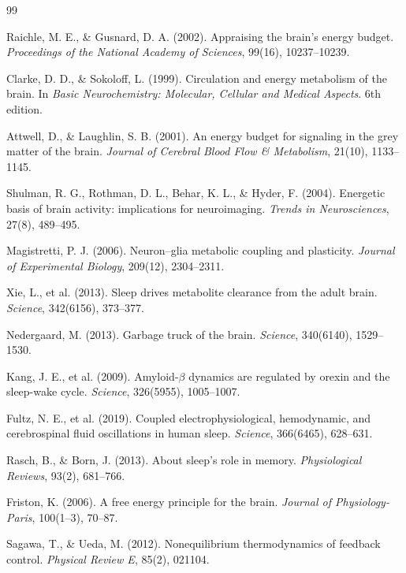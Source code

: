 \documentclass[12pt]{article}
\theoremstyle{remark}
\begin{document}

\begin{thebibliography}{99}

Raichle, M. E., \& Gusnard, D. A. (2002). Appraising the brain's energy budget. \textit{Proceedings of the National Academy of Sciences}, 99(16), 10237--10239.

Clarke, D. D., \& Sokoloff, L. (1999). Circulation and energy metabolism of the brain. In \textit{Basic Neurochemistry: Molecular, Cellular and Medical Aspects}. 6th edition.

Attwell, D., \& Laughlin, S. B. (2001). An energy budget for signaling in the grey matter of the brain. \textit{Journal of Cerebral Blood Flow \& Metabolism}, 21(10), 1133--1145.

Shulman, R. G., Rothman, D. L., Behar, K. L., \& Hyder, F. (2004). Energetic basis of brain activity: implications for neuroimaging. \textit{Trends in Neurosciences}, 27(8), 489--495.

Magistretti, P. J. (2006). Neuron--glia metabolic coupling and plasticity. \textit{Journal of Experimental Biology}, 209(12), 2304--2311.

Xie, L., et al. (2013). Sleep drives metabolite clearance from the adult brain. \textit{Science}, 342(6156), 373--377.

Nedergaard, M. (2013). Garbage truck of the brain. \textit{Science}, 340(6140), 1529--1530.

Kang, J. E., et al. (2009). Amyloid-$\beta$ dynamics are regulated by orexin and the sleep-wake cycle. \textit{Science}, 326(5955), 1005--1007.

Fultz, N. E., et al. (2019). Coupled electrophysiological, hemodynamic, and cerebrospinal fluid oscillations in human sleep. \textit{Science}, 366(6465), 628--631.

Rasch, B., \& Born, J. (2013). About sleep's role in memory. \textit{Physiological Reviews}, 93(2), 681--766.

Friston, K. (2006). A free energy principle for the brain. \textit{Journal of Physiology-Paris}, 100(1--3), 70--87.

Sagawa, T., \& Ueda, M. (2012). Nonequilibrium thermodynamics of feedback control. \textit{Physical Review E}, 85(2), 021104.


\end{thebibliography}
\end{document}

